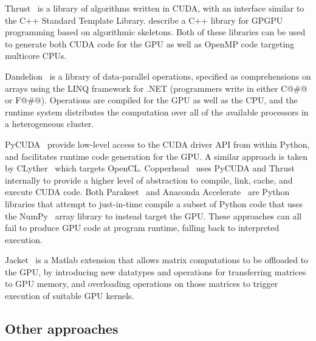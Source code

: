 Thrust~\cite{ThrustAParallelT:ub} is a library of algorithms written in CUDA,
with an interface similar to the C++ Standard Template Library.
\citet{Sato:2009cq} describe a C++ library for GPGPU programming based on
algorithmic skeletons. Both of these libraries can be used to generate both CUDA
code for the GPU as well as OpenMP code targeting multicore CPUs.



Dandelion~\cite{Rossbach:2013bj} is a library of data-parallel operations,
specified as comprehensions on arrays using the LINQ framework for .NET
(programmers write in either C@#@ or F@#@). Operations are compiled for the GPU
as well as the CPU, and the runtime system distributes the computation over all
of the available processors in a heterogeneous cluster.

PyCUDA~\cite{Klockner:2012tj} provide low-level access to the CUDA driver API
from within Python, and facilitates runtime code generation for the GPU\@. A
similar approach is taken by CLyther~\cite{CLyther:EvXSiruK} which targets
OpenCL. Copperhead~\cite{Catanzaro:2011cn} uses PyCUDA and Thrust internally to
provide a higher level of abstraction to compile, link, cache, and execute CUDA
code. Both Parakeet~\cite{Rubinsteyn:2012ve} and Anaconda
Accelerate~\cite{AnacondaAccelerate:2013vn} are Python libraries that attempt to
just-in-time compile a subset of Python code that uses the
NumPy~\cite{NumPy:2006uq} array library to instead target the GPU\@. These
approaches can all fail to produce GPU code at program runtime, falling back to
interpreted execution.

Jacket~\cite{AccelerEyes:vq} is a Matlab extension that allows matrix
computations to be offloaded to the GPU, by introducing new datatypes and
operations for transferring matrices to GPU memory, and overloading operations
on those matrices to trigger execution of suitable GPU kernels.


\subsection{Other approaches}

